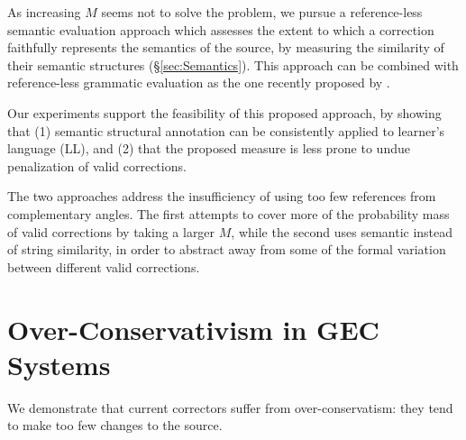 \documentclass[letter,11pt]{article}
\begin{document}
As increasing $M$ seems not to solve the problem, we pursue a reference-less semantic evaluation approach which assesses the extent to which
a correction faithfully represents the semantics of the source, by measuring the
{\color{red} similarity of their semantic structures (\S \ref{sec:Semantics}). This approach can be combined with reference-less grammatic evaluation as the one recently proposed by \cite{napoles-sakaguchi-tetreault:2016:EMNLP2016}.}

Our experiments support the feasibility of this proposed approach,
by showing that (1) semantic structural annotation can be consistently applied
to learner's language (LL), and (2) that the proposed measure is less prone to
undue penalization of valid corrections.

The two approaches address the insufficiency of using too few references from
complementary angles. The first attempts to cover more of the probability
mass of valid corrections by taking a larger $M$, 
while the second uses semantic instead of string similarity, in order
to abstract away from some of the formal variation between different valid corrections.


\section{Over-Conservativism in GEC Systems}\label{sec:formal_conservatism}



We demonstrate that current correctors
suffer from over-conservatism: they tend to make too few changes to the source. 
\end{document}

